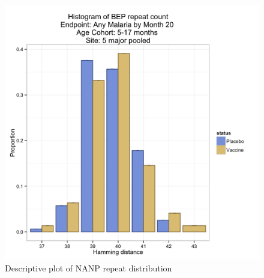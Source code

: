 \documentclass[]{article}
\begin{document}
\begin{figure}[htbp]
\centering
\includegraphics{figures/bep-hist-infant-x-1.png}
\caption{Descriptive plot of NANP repeat distribution}
\end{figure}
\end{document}

